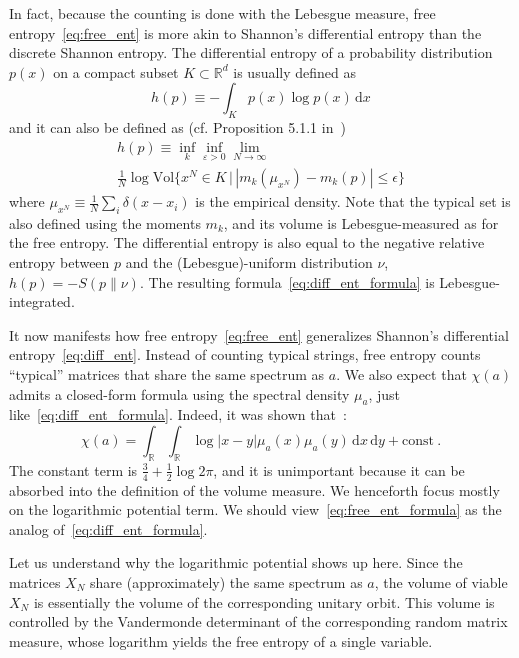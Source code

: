 \documentclass[aps,pre,twocolumn,superscriptaddress,amsmath,amssymb,reprint]{revtex4-2}
\newcommand{\dd}{\mathrm{d}}
\def\eps{\varepsilon}
\begin{document}
In fact, because the counting is done with the Lebesgue measure, free entropy~\eqref{eq:free_ent} is more akin to Shannon's differential entropy than the discrete Shannon entropy. The differential entropy of a probability distribution $p( x)$ on a compact subset $K\subset\mathbb R^d$ is usually defined as
\begin{equation}\label{eq:diff_ent_formula}
   h( p) \equiv - \int_K p( x)\log p( x)\,\dd x
\end{equation}
and it can also be defined as (cf. Proposition 5.1.1 in~\cite{hiai2000semicircle})
\begin{multline}\label{eq:diff_ent}
    h( p)\equiv \inf_{k}\inf_{\eps>0}\lim_{N\to\infty}\\\frac1N\log \mathrm{Vol}\{x^N\in K \, \big\vert\, |m_k(\mu_{x^N})-m_k(p)|\le\epsilon \}
\end{multline}
where $\mu_{x^N}\equiv\frac1N\sum_i \delta(x-x_i)$ is the empirical density. Note that the typical set is also defined using the moments $m_k$, and its volume is Lebesgue-measured as for the free entropy. The differential entropy is also equal to the negative relative entropy between $p$ and the (Lebesgue)-uniform distribution $\nu$, $h(p)=-S(p\|\nu)$. The resulting formula~\eqref{eq:diff_ent_formula} is Lebesgue-integrated. 

It now manifests how free entropy~\eqref{eq:free_ent} generalizes Shannon's differential entropy~\eqref{eq:diff_ent}. Instead of counting typical strings, free entropy counts ``typical'' matrices that share the same spectrum as $a$. We also expect that $\chi(a)$ admits a closed-form formula using the spectral density $\mu_{a}$, just like~\eqref{eq:diff_ent_formula}. Indeed, it was shown that~\cite{voiculescu1994analogues,arous1997large,hiai2000semicircle}:
\begin{equation}\label{eq:free_ent_formula}
    \chi(a) = \int_{\mathbb{R}}\int_{\mathbb{R}} \log|x-y|\mu_{a}(x)\mu_{a}(y)\,\dd x\, \dd y + \mathrm{const}\ .
\end{equation}
The constant term is $\frac{3}{4}+\frac12\log 2\pi$, and it is unimportant because it can be absorbed into the definition of the volume measure. We henceforth focus mostly on the logarithmic potential term. We should view~\eqref{eq:free_ent_formula} as the analog of~\eqref{eq:diff_ent_formula}. 

Let us understand why the logarithmic potential shows up here. Since the matrices $X_N$ share (approximately) the same spectrum as $a$, the volume of viable $X_N$ is essentially the volume of the corresponding unitary orbit. This volume is controlled by the Vandermonde determinant of the corresponding random matrix measure, whose logarithm yields the free entropy of a single variable.
\end{document}
